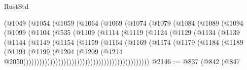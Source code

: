 \begin{lexlean}{RustStd}
\begin{coremodule}
{\begin{coremodule}
{{{{{{{{{{{{{{                            (@1049
                              (@1054
                                (@1059
                                  (@1064
                                    (@1069
                                      (@1074
                                        (@1079
                                          (@1084
                                            (@1089
                                              (@1094
                                                (@1099
                                                  (@1104
                                                    (@535
                                                      (@1109
                                                        (@1114
                                                          (@1119
                                                            (@1124
                                                              (@1129
                                                                (@1134
                                                                  (@1139
                                                                    (@1144
                                                                      (@1149
                                                                        (@1154
                                                                          (@1159
                                                                            (@1164
                                                                              (@1169
                                                                                (@1174
                                                                                  (@1179
                                                                                    (@1184
                                                                                      (@1189
                                                                                        (@1194
                                                                                          (@1199
                                                                                            (@1204
                                                                                              (@1209
                                                                                                (@1214
                                                                                                  @2050)))))))))))))))))))))))))))))))))))))))))))))))
@2146 := @837
    (@842
      (@847
}}}}}}}}}}}}}}
\end{coremodule}}
\end{coremodule}
\end{lexlean}
